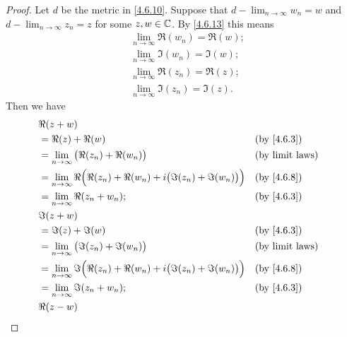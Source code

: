 \begin{proof}
  Let \(d\) be the metric in \cref{4.6.10}.
  Suppose that \(d - \lim_{n \to \infty} w_n = w\) and \(d - \lim_{n \to \infty} z_n = z\) for some \(z, w \in \mathbb{C}\).
  By \cref{4.6.13} this means
  \begin{align*}
     & \lim_{n \to \infty} \Re(w_n) = \Re(w); \\
     & \lim_{n \to \infty} \Im(w_n) = \Im(w); \\
     & \lim_{n \to \infty} \Re(z_n) = \Re(z); \\
     & \lim_{n \to \infty} \Im(z_n) = \Im(z).
  \end{align*}
  Then we have
  \begin{align*}
     & \Re(z + w)                                                                                                             \\
     & = \Re(z) + \Re(w)                                                                        &  & \text{(by \cref{4.6.3})} \\
     & = \lim_{n \to \infty} \big(\Re(z_n) + \Re(w_n)\big)                                      &  & \text{(by limit laws)}   \\
     & = \lim_{n \to \infty} \Re\Big(\Re(z_n) + \Re(w_n) + i \big(\Im(z_n) + \Im(w_n)\big)\Big) &  & \text{(by \cref{4.6.8})} \\
     & = \lim_{n \to \infty} \Re(z_n + w_n);                                                    &  & \text{(by \cref{4.6.3})} \\
     & \Im(z + w)                                                                                                             \\
     & = \Im(z) + \Im(w)                                                                        &  & \text{(by \cref{4.6.3})} \\
     & = \lim_{n \to \infty} \big(\Im(z_n) + \Im(w_n)\big)                                      &  & \text{(by limit laws)}   \\
     & = \lim_{n \to \infty} \Im\Big(\Re(z_n) + \Re(w_n) + i \big(\Im(z_n) + \Im(w_n)\big)\Big) &  & \text{(by \cref{4.6.8})} \\
     & = \lim_{n \to \infty} \Im(z_n + w_n);                                                    &  & \text{(by \cref{4.6.3})} \\
     & \Re(z - w)                                                                                                             \\

\end{align*}
\end{proof}
